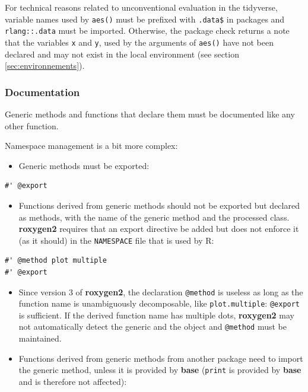 \documentclass[
  12pt,
  american,
  a4paper,
  extrafontsizes,onecolumn,openright
  ]{memoir}
\providecommand{\tightlist}{%
  \setlength{\itemsep}{0pt}\setlength{\parskip}{0pt}}
\begin{document}
\normalsize

For technical reasons related to unconventional evaluation in the tidyverse, variable names used by \texttt{aes()} must be prefixed with \texttt{.data\$} in packages and \texttt{rlang::.data} must be imported.
Otherwise, the package check returns a note that the variables \texttt{x} and \texttt{y}, used by the arguments of \texttt{aes()} have not been declared and may not exist in the local environment (see section \ref{sec:environnements}).

\subsubsection{Documentation}\label{documentation}

Generic methods and functions that declare them must be documented like any other function.

Namespace management is a bit more complex:

\begin{itemize}
\tightlist
\item
  Generic methods must be exported:
\end{itemize}

\begin{verbatim}
#' @export
\end{verbatim}

\begin{itemize}
\tightlist
\item
  Functions derived from generic methods should not be exported but declared as methods, with the name of the generic method and the processed class.
  \textbf{roxygen2} requires that an export directive be added but does not enforce it (as it should) in the \texttt{NAMESPACE} file that is used by R:
\end{itemize}

\begin{verbatim}
#' @method plot multiple
#' @export
\end{verbatim}

\begin{itemize}
\item
  Since version 3 of \textbf{roxygen2}, the declaration \texttt{@method} is useless as long as the function name is unambiguously decomposable, like \texttt{plot.multiple}: \texttt{@export} is sufficient.
  If the derived function name has multiple dots, \textbf{roxygen2} may not automatically detect the generic and the object and \texttt{@method} must be maintained.
\item
  Functions derived from generic methods from another package need to import the generic method, unless it is provided by \textbf{base} (\texttt{print} is provided by \textbf{base} and is therefore not affected):
\end{itemize}
\end{document}

